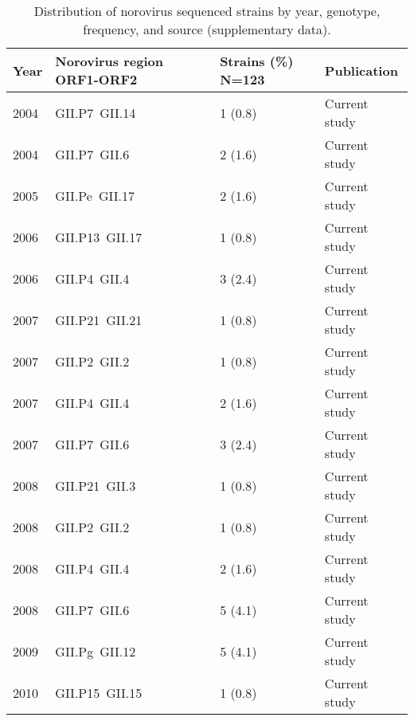 \begin{table}[htbp]
	\centering
	\caption{Distribution of norovirus sequenced strains by year, genotype, frequency, and source (supplementary data).}
	\scriptsize
	\begin{tabular}{p{0.6cm}p{3.2cm}p{1.8cm}p{2.5cm}}
		\toprule
		\textbf{Year} & \textbf{Norovirus region ORF1-ORF2} & \textbf{Strains (\%) N=123} & \textbf{Publication}   \\
		\midrule
		2004          & GII.P7~GII.14                       & 1 (0.8)                     & Current study          \\
		2004          & GII.P7~GII.6                        & 2 (1.6)                     & Current study          \\
		2005          & GII.Pe~GII.17                       & 2 (1.6)                     & Current study          \\
		2006          & GII.P13~GII.17                      & 1 (0.8)                     & Current study          \\
		2006          & GII.P4~GII.4                        & 3 (2.4)                     & Current study          \\
		2007          & GII.P21~GII.21                      & 1 (0.8)                     & Current study          \\
		2007          & GII.P2~GII.2                        & 1 (0.8)                     & Current study          \\
		2007          & GII.P4~GII.4                        & 2 (1.6)                     & Current study          \\
		2007          & GII.P7~GII.6                        & 3 (2.4)                     & Current study          \\
		2008          & GII.P21~GII.3                       & 1 (0.8)                     & Current study          \\
		2008          & GII.P2~GII.2                        & 1 (0.8)                     & Current study          \\
		2008          & GII.P4~GII.4                        & 2 (1.6)                     & Current study          \\
		2008          & GII.P7~GII.6                        & 5 (4.1)                     & Current study          \\
		2009          & GII.Pg~GII.12                       & 5 (4.1)                     & Current study          \\
		2010          & GII.P15~GII.15                      & 1 (0.8)                     & Current study          \\

\end{tabular}
\end{table}
